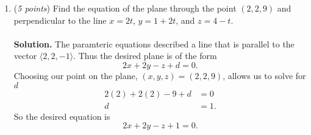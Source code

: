 \documentclass[12 pt]{article}
\begin{document}
\begin{enumerate}
		\item (\textit{5 points})
		Find the equation of the plane through the point $(2, 2, 9)$ and
		perpendicular to the line $x = 2t$, $y = 1 + 2t$, and $z = 4 - t$.
		\\~\\
		\textbf{Solution.}
		The paramteric equations described a line that is parallel to the vector
		$\langle 2, 2, -1 \rangle$. Thus the desired plane is of the form \[
			2x + 2y - z + d = 0.
		\] Choosing our point on the plane, $(x, y, z) = (2, 2, 9)$, allows us to
		solve for $d$ \begin{align*}
			2(2) + 2(2) - 9 + d &= 0 \\
			d &= 1.
		\end{align*} So the desired equation is \[
			2x + 2y - z + 1 = 0.
		\]
  \end{enumerate}
\end{document}
